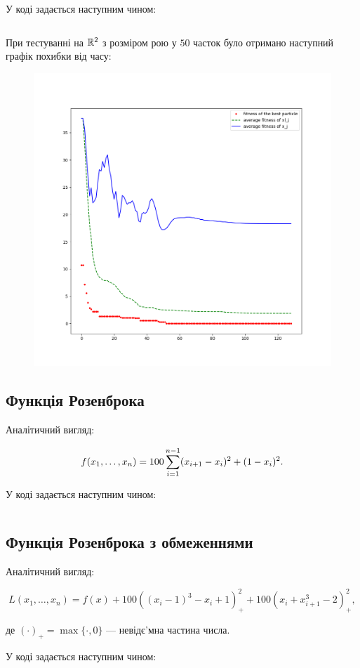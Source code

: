 \documentclass[a4paper, 12pt]{article}
\numberwithin{equation}{section}
\begin{document}
У коді задається наступним чином:

\inputminted[firstline=13,lastline=16]{python}{../code/pso.py}

При тестуванні на $\mathbb{R}^2$ з розміром рою у $50$ часток було отримано наступний графік похибки від часу:
\begin{figure}[H]
    \centering
    \includegraphics[width=.78\textwidth]{../code/err.png}
\end{figure}

\subsection{Функція Розенброка}

Аналітичний вигляд:

\begin{equation}
    f(x_1, \ldots, x_n) = 100 \operatorname*{\sum}_{i = 1}^{n - 1} (x_{i + 1} - x_i)^2 + (1 - x_i)^2.
\end{equation}

У коді задається наступним чином:

\inputminted[firstline=22,lastline=25]{python}{../code/pso.py}

\subsection{Функція Розенброка з обмеженнями}

Аналітичний вигляд:

\begin{equation}
    L(x_1, \ldots, x_n) = f(x) + 100  ((x_i - 1)^3 - x_i + 1)_+^2 + 100  (x_i + x_{i + 1}^3 - 2)_+^2,
\end{equation}

де $(\cdot)_+ = \max\{ \cdot, 0\}$ --- невідє'мна частина числа. \medskip


У коді задається наступним чином:

\inputminted[firstline=31,lastline=36]{python}{../code/pso.py}

\newpage


\end{document}

